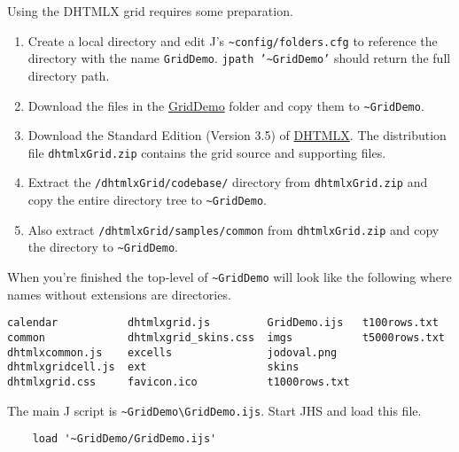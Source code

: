 Using the DHTMLX grid requires some preparation.

\begin{enumerate}
\item
  Create a local directory and edit J's
  \texttt{\textasciitilde{}config/folders.cfg} to reference the
  directory with the name \texttt{GridDemo}.
  \texttt{jpath '\textasciitilde{}GridDemo'} should return the full
  directory path.
\item
  Download the files in the
  \href{https://github.com/bakerjd99/jacks/tree/master/griddemo}{GridDemo} folder and
  copy them to \texttt{\textasciitilde{}GridDemo}.
\item
  Download the Standard Edition (Version 3.5) of
  \href{http://dhtmlx.com/docs/products/dhtmlxGrid/index.shtml}{DHTMLX}.
  The distribution file \texttt{dhtmlxGrid.zip} contains the grid source
  and supporting files.
\item
  Extract the \texttt{/dhtmlxGrid/codebase/} directory from
  \texttt{dhtmlxGrid.zip} and copy the entire directory tree to
  \texttt{\textasciitilde{}GridDemo}.
\item
  Also extract \texttt{/dhtmlxGrid/samples/common} from
  \texttt{dhtmlxGrid.zip} and copy the directory to
  \texttt{\textasciitilde{}GridDemo}.
\end{enumerate}

When you're finished the top-level of \texttt{\textasciitilde{}GridDemo}
will look like the following where names without extensions are
directories.

\begin{tcolorbox}[breakable, size=fbox, boxrule=1pt, pad at break*=1mm,colback=cellbackground, colframe=cellborder]
\begin{verbatim}
calendar           dhtmlxgrid.js         GridDemo.ijs   t100rows.txt
common             dhtmlxgrid_skins.css  imgs           t5000rows.txt
dhtmlxcommon.js    excells               jodoval.png
dhtmlxgridcell.js  ext                   skins
dhtmlxgrid.css     favicon.ico           t1000rows.txt
\end{verbatim}
\end{tcolorbox}

\noindent The main J script is
\texttt{\textasciitilde{}GridDemo\textbackslash{}GridDemo.ijs}. Start
JHS and load this file.

\begin{tcolorbox}[breakable, size=fbox, boxrule=1pt, pad at break*=1mm,colback=cellbackground, colframe=cellborder]
\begin{verbatim}
    load '~GridDemo/GridDemo.ijs'
\end{verbatim}
\end{tcolorbox}

